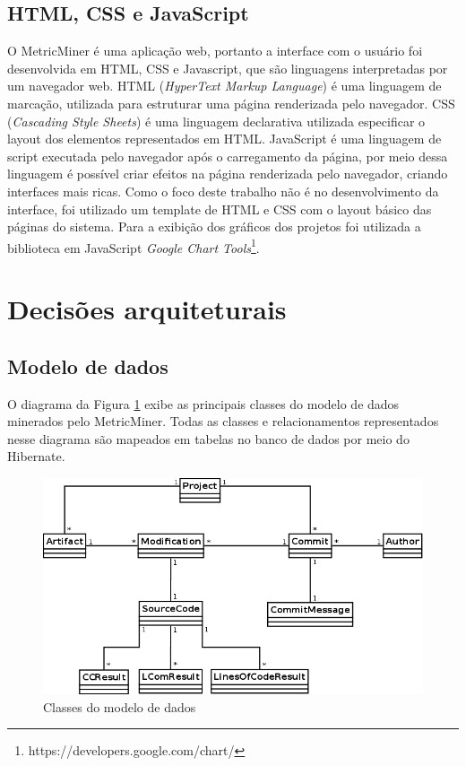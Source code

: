 \documentclass[a4paper, 12pt, twoside]{book}
\begin{document}
        \subsection*{HTML, CSS e JavaScript}
            O MetricMiner é uma aplicação web, portanto a interface com o usuário foi desenvolvida em HTML, CSS e Javascript, que são linguagens interpretadas por um navegador web. HTML (\textit{HyperText Markup Language}) é uma linguagem de marcação, utilizada para estruturar uma página renderizada pelo navegador. CSS (\textit{Cascading Style Sheets}) é uma linguagem declarativa utilizada especificar o layout dos elementos representados em HTML. JavaScript é uma linguagem de script executada pelo navegador após o carregamento da página, por meio dessa linguagem é possível criar efeitos na página renderizada pelo navegador, criando interfaces mais ricas. Como o foco deste trabalho não é no desenvolvimento da interface, foi utilizado um template de HTML e CSS com o layout básico das páginas do sistema. Para a exibição dos gráficos dos projetos foi utilizada a biblioteca em JavaScript \textit{Google Chart Tools}\footnote{https://developers.google.com/chart/}.

    \section{Decisões arquiteturais} \label{sc:arquitetura}

        \subsection*{Modelo de dados}
            O diagrama da Figura \ref{fig:uml_modelo} exibe as principais classes do modelo de dados minerados pelo MetricMiner. Todas as classes e relacionamentos representados nesse diagrama são mapeados em tabelas no banco de dados por meio do Hibernate. 

        \begin{figure}[ht]
            \centering
            \includegraphics[width=1.00\textwidth]{img/uml-modelo.png}
            \caption{Classes do modelo de dados}
            \label{fig:uml_modelo}
        \end{figure}
\end{document}
